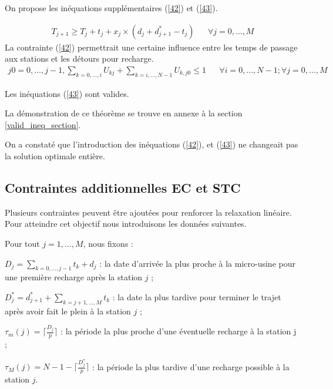 {On propose les inéquations supplémentaires (\ref{42}) et (\ref{43}).

\begin{equation}\label{42}
\begin{align}
T_{j+1} \geq T_j +t_j + x_j \times (d_{j}+d^*_{j+1}-t_j)&  & \forall j= 0, \dots, M
\end{align}
\end{equation}
La contrainte (\ref{42}) permettrait une certaine influence entre les temps de passage aux stations
et les détours pour recharge.
\begin{equation}\label{43}
\begin{align}
j0=0, \dots, j-1,	\sum_{ k=0, \dots, i} U_{kj} + \sum_{ k=i, \dots, N-1}U_{k,j0}\leq 1
&  &\forall i=0, \dots, N-1; \forall j= 0, \dots, M
\end{align}
\end{equation}

\begin{theo}
	\label{valid_ineq}
Les inéquations (\ref{43}) sont valides.
\end{theo}
La démonstration de ce théorème se trouve en annexe à la section \ref{valid_ineq_section}.

On a constaté que l'introduction des inéquations (\ref{42}), et (\ref{43}) ne changeait
pas la solution optimale entière.
}

\subsection{Contraintes additionnelles EC et STC}

Plusieurs contraintes peuvent être ajoutées pour renforcer la relaxation linéaire. Pour atteindre cet objectif nous introduisons les données suivantes.

Pour tout $j = 1, \dots, M$, nous fixons :

$D_j = \sum_{ k=0, \dots, j-1} t_k+d_j$ : la date d'arrivée la plus proche à la micro-usine pour une première recharge après la station $j$ ;

$D_j^* = d_{j+1}^* + \sum_{k=j+1, \dots, M} t_k$ : la date la plus tardive pour terminer le trajet après avoir fait le plein à la station $j$ ;

$\tau_m(j) = \lceil \frac{D_j}{p} \rceil$
: la période la plus proche d'une éventuelle recharge à la station j ;

$\tau_M(j) = N-1- \lceil \frac{D_j^*}{p} \rceil$
: la période la plus tardive d'une recharge possible à la station $j$.

